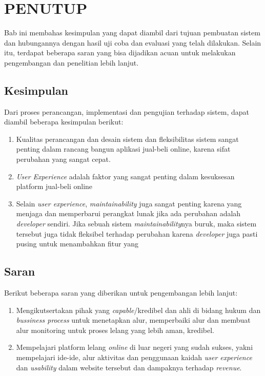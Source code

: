 \chapter{PENUTUP}
  Bab ini membahas kesimpulan yang dapat diambil dari tujuan pembuatan sistem dan hubungannya dengan hasil uji coba dan evaluasi yang telah dilakukan. Selain itu, terdapat beberapa saran yang bisa dijadikan acuan untuk melakukan pengembangan dan penelitian lebih lanjut.
  \section{Kesimpulan}
  Dari proses perancangan, implementasi dan pengujian terhadap sistem, dapat diambil beberapa kesimpulan berikut:
  \begin{enumerate}
    \item Kualitas perancangan dan desain sistem dan fleksibilitas sistem sangat penting dalam rancang bangun aplikasi jual-beli online, karena sifat perubahan yang sangat cepat.
    \item \textit{User Experience} adalah faktor yang sangat penting dalam kesuksesan platform jual-beli online
    \item Selain \textit{user experience}, \textit{maintainability} juga sangat penting karena yang menjaga dan memperbarui perangkat lunak jika ada perubahan adalah \textit{developer} sendiri. Jika sebuah sistem \textit{maintainability}nya buruk, maka sistem tersebut juga tidak fleksibel terhadap perubahan karena \textit{developer} juga pasti pusing untuk menambahkan fitur yang 
  \end{enumerate}
  
  \section{Saran}
  Berikut beberapa saran yang diberikan untuk pengembangan lebih lanjut:
  \begin{enumerate}
    \item Mengikutsertakan pihak yang \textit{capable}/kredibel dan ahli di bidang hukum dan \textit{bussiness process} untuk menetapkan alur, memperbaiki alur dan membuat alur monitoring untuk proses lelang yang lebih aman, kredibel.
    \item Mempelajari platform lelang \textit{online} di luar negeri yang sudah sukses, yakni mempelajari ide-ide, alur aktivitas dan penggunaan kaidah \textit{user experience} dan \textit{usability} dalam website tersebut dan dampaknya terhadap \textit{revenue}.
  \end{enumerate}
  
